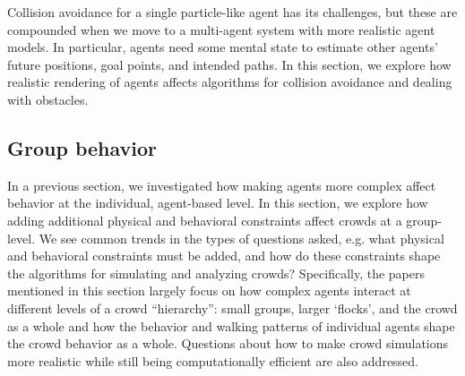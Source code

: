 \documentclass[tog]{acmsiggraph}
\begin{document}
Collision avoidance for a single particle-like agent has its challenges, but these are compounded when we move to a multi-agent system with more realistic agent models. In particular, agents need some mental state to estimate other agents' future positions, goal points, and intended paths. In this section, we explore how realistic rendering of agents affects algorithms for collision avoidance and dealing with obstacles.

\subsection{Group behavior}

In a previous section, we investigated how making agents more complex affect behavior at the individual, agent-based level. In this section, we explore how adding additional physical and behavioral constraints affect crowds at a group-level. We see common trends in the types of questions asked, e.g. what physical and behavioral constraints must be added, and how do these constraints shape the algorithms for simulating and analyzing crowds? Specifically, the papers mentioned in this section largely focus on how complex agents interact at different levels of a crowd ``hierarchy'': small groups, larger `flocks', and the crowd as a whole and how the behavior and walking patterns of individual agents shape the crowd behavior as a whole. Questions about how to make crowd simulations more realistic while still being computationally efficient are also addressed.

\end{document}
